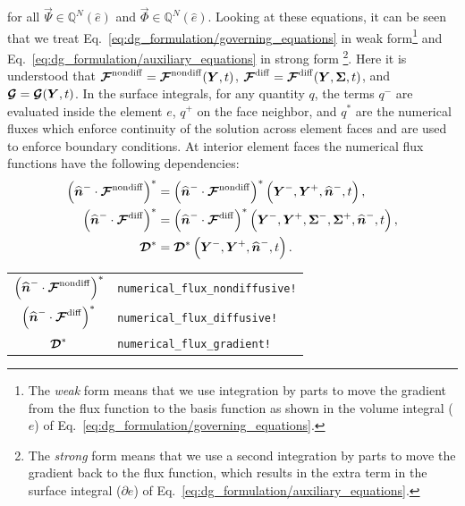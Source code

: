 \documentclass{report}
\begin{document}
for all $\vec{\Psi} \in \mathbb{Q}^{N}(\hat{e})$ and $\vec{\Phi} \in
\mathbb{Q}^{N}(\hat{e})$.  Looking at these equations, it can be seen that we treat Eq.\ \eqref{eq:dg_formulation/governing_equations} in weak form\footnote{The \emph{weak} form means that we use integration by parts to move the gradient from the flux function to the basis function as shown in the volume integral ($e$) of Eq.\ \eqref{eq:dg_formulation/governing_equations}.} and Eq.\ \eqref{eq:dg_formulation/auxiliary_equations} in strong form \footnote{The \emph{strong} form means that we use a second integration by parts to move the gradient back to the flux function, which results in the extra term in the surface integral ($\partial e$) of Eq.\ \eqref{eq:dg_formulation/auxiliary_equations}.}. Here it is understood that $\boldsymbol{{\mathcal{F}}}^{\mathrm{nondiff}} =
\boldsymbol{{\mathcal{F}}}^{\mathrm{nondiff}}(\boldsymbol{{Y}}, t)$, $\boldsymbol{{\mathcal{F}}}^{\mathrm{diff}} = \boldsymbol{{\mathcal{F}}}^{\mathrm{diff}}(\boldsymbol{{Y}}, \boldsymbol{{\Sigma}}, t)$, and
$\boldsymbol{{\mathcal{G}}} = \boldsymbol{{\mathcal{G}}}(\boldsymbol{{Y}}, t)$. In the surface integrals, for any quantity $q$, the
terms $q^-$ are evaluated inside the element $e$, $q^+$ on the face neighbor, and $q^*$ are the numerical fluxes which enforce continuity of the solution
across element faces and are used to enforce boundary conditions. At
interior element faces the numerical flux functions have the following
dependencies:
\begin{align}
  {\left(\widehat{\boldsymbol{{n}}}^{-} \cdot \boldsymbol{{\mathcal{F}}}^{\mathrm{nondiff}}\right)}^{*}
  &=
  {\left(\widehat{\boldsymbol{{n}}}^{-} \cdot \boldsymbol{{\mathcal{F}}}^{\mathrm{nondiff}}\right)}^{*}
  \left(
  \boldsymbol{{Y}}^{-}, \boldsymbol{{Y}}^{+}, \widehat{\boldsymbol{{n}}}^{-}, t
  \right),\\
  {\left(\widehat{\boldsymbol{{n}}}^{-} \cdot \boldsymbol{{\mathcal{F}}}^{\mathrm{diff}}\right)}^{*}
  &=
  {\left(\widehat{\boldsymbol{{n}}}^{-} \cdot \boldsymbol{{\mathcal{F}}}^{\mathrm{diff}}\right)}^{*}
  \left(
  \boldsymbol{{Y}}^{-}, \boldsymbol{{Y}}^{+}, \boldsymbol{{\Sigma}}^{-}, \boldsymbol{{\Sigma}}^{+}, \widehat{\boldsymbol{{n}}}^{-}, t
  \right),\\
  \boldsymbol{{\mathcal{D}}}^{*} &=
  \boldsymbol{{\mathcal{D}}}^{*}\left(
  \boldsymbol{{Y}}^{-}, \boldsymbol{{Y}}^{+}, \widehat{\boldsymbol{{n}}}^{-}, t
  \right).
\end{align}


\begin{table}[htbp]
  \centering
  \begin{tabular}{cl}
    ${\left(\widehat{\boldsymbol{{n}}}^{-} \cdot \boldsymbol{{\mathcal{F}}}^{\mathrm{nondiff}}\right)}^{*}$ & \texttt{numerical\_flux\_nondiffusive!}\\
    ${\left(\widehat{\boldsymbol{{n}}}^{-} \cdot \boldsymbol{{\mathcal{F}}}^{\mathrm{diff}}\right)}^{*}$    & \texttt{numerical\_flux\_diffusive!}\\
    $\boldsymbol{{\mathcal{D}}}^{*}$                               & \texttt{numerical\_flux\_gradient!}\\
  \end{tabular}
\end{table}
\end{document}
